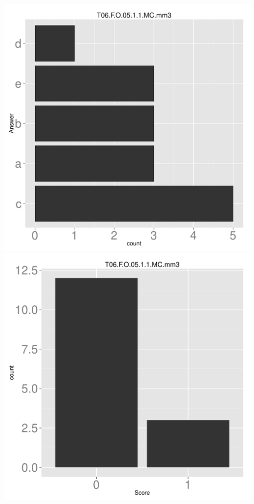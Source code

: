 \documentclass[12pt,nohyper]{tufte-handout}\usepackage[]{graphicx}\usepackage[]{color}
\begin{document}
\begin{center} \includegraphics[width=.45\linewidth]{Topic06_55_answer} \includegraphics[width=.45\linewidth]{Topic06_55_score} \end{center} 
\end{document}
